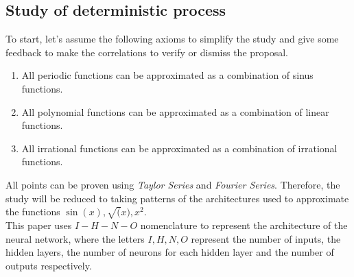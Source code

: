 \documentclass[a4paper, 11pt]{article}
\begin{document}
\newpage
\subsection{Study of deterministic process}
To start, let's assume the following axioms to simplify the study and give some feedback to make the correlations to verify or dismiss the proposal.
\begin{enumerate}
    \item All periodic functions can be approximated as a combination of sinus functions.
    \item All polynomial functions can be approximated as a combination of linear functions.
    \item All irrational functions can be approximated as a combination of irrational functions.
\end{enumerate}
All points can be proven using \textit{Taylor Series} and \textit{Fourier Series}.
Therefore, the study will be reduced to taking patterns of the architectures used to approximate the functions $\sin(x), \sqrt(x), x^2$.\\
This paper uses $I-H-N-O$ nomenclature to represent the architecture of the neural network, where the letters $I,H,N,O$ represent the number of inputs, the hidden layers, the number of neurons for each hidden layer and the number of outputs respectively.
\end{document}
